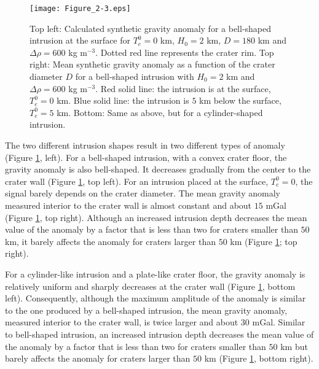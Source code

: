 \begin{figure}[h!]
  \graphicspath{ {/Users/thorey/Documents/These/Projet/FFC/Gravi_GRAIL/Article/Papier/SOUMISSION_2_EPSL/} }
  \begin{center}
    \texttt{[image: Figure\_2-3.eps]}
    \caption{Top  left: Calculated  synthetic  gravity  anomaly for  a
      bell-shaped  intrusion  at  the  surface for  $T_e^0  =  0$  km,
      $H_0 = 2$ km, $D = 180$  km and $\Delta \rho = 600$ kg m$^{-3}$.
      Dotted  red line  represents the  crater rim.   Top right:  Mean
      synthetic gravity anomaly  as a function of  the crater diameter
      $D$  for  a  bell-shaped  intrusion   with  $H_0  =  2$  km  and
      $\Delta \rho = 600$ kg  m$^{-3}$.  Red solid line: the intrusion
      is  at  the  surface,  $T_e^0  =0$ km.   Blue  solid  line:  the
      intrusion is $5$ km below the  surface, $T_e^0 = 5$ km.  Bottom:
      Same as above, but for a cylinder-shaped intrusion.}
    \label{Figure2-3}
  \end{center}
\end{figure}

The two  different intrusion shapes  result in two different  types of
anomaly (Figure \ref{Figure2-3}, left).   For a bell-shaped intrusion,
with a convex  crater floor, the gravity anomaly  is also bell-shaped.
It  decreases gradually  from the  center to  the crater  wall (Figure
\ref{Figure2-3}, top left).   For an intrusion placed  at the surface,
$T_e^0 =0$,  the signal  barely depends on  the crater  diameter.  The
mean gravity  anomaly measured interior  to the crater wall  is almost
constant  and about  $15$  mGal (Figure  \ref{Figure2-3}, top  right).
Although an increased intrusion depth  decreases the mean value of the
anomaly by  a factor that  is less than  two for craters  smaller than
$50$ km, it barely affects the anomaly for craters larger than $50$ km
(Figure \ref{Figure2-3}; top right).

For  a cylinder-like  intrusion  and a  plate-like  crater floor,  the
gravity anomaly  is relatively  uniform and  sharply decreases  at the
crater  wall  (Figure  \ref{Figure2-3}, bottom  left).   Consequently,
although the  maximum amplitude of the  anomaly is similar to  the one
produced  by  a  bell-shaped  intrusion,  the  mean  gravity  anomaly,
measured interior to  the crater wall, is twice larger  and about $30$
mGal. Similar  to bell-shaped intrusion, an  increased intrusion depth
decreases the mean value of the anomaly  by a factor that is less than
two for  craters smaller than $50$  km but barely affects  the anomaly
for  craters  larger  than  $50$ km  (Figure  \ref{Figure2-3},  bottom
right).
  
